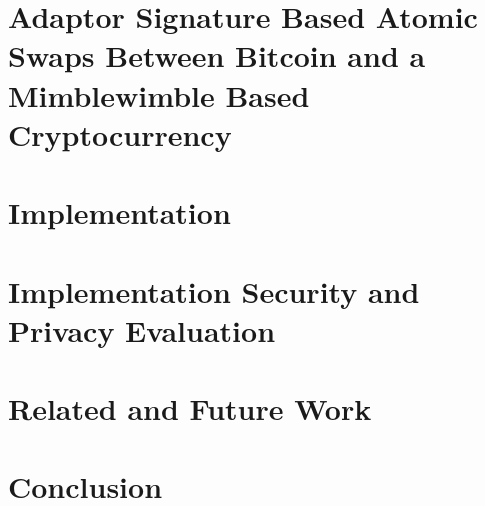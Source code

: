 \documentclass[draft,final]{vutinfth} %
\begin{document}
\chapter{Adaptor Signature Based Atomic Swaps Between Bitcoin and a Mimblewimble Based Cryptocurrency}\label{chapAtomic}


\chapter{Implementation}\label{chapImp}


\chapter{Implementation Security and Privacy Evaluation}\label{chapImplSec}


\chapter{Related and Future Work}\label{chapFut}


\chapter{Conclusion}\label{chapConc}



\backmatter

\listoffigures %

\cleardoublepage %
\listoftables %

\listofalgorithms
{}

\printindex

\printglossaries



\end{document}
